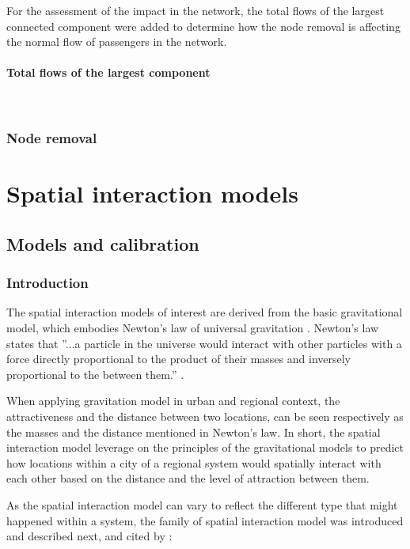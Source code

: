 \documentclass{article}
\begin{document}
For the assessment of the impact in the network, the total flows of the largest connected component were added to determine how the node removal is affecting the normal flow of passengers in the network.

\paragraph{Total flows of the largest component}\mbox{}\\



\subsubsection{Node removal}

\section{Spatial interaction models}


\subsection{Models and calibration}

\subsubsection{Introduction}

The spatial interaction models of interest are derived from the basic gravitational model, which embodies Newton's law of universal gravitation \citep{battyUrbanModellingAlgorithms1976}. Newton's law states that ''...a particle in the universe would interact with other particles with a force directly proportional to the product of their masses and inversely proportional to the between them.'' \citep{battyUrbanSimulationSpatial2023}.

When applying gravitation model in urban and regional context, the attractiveness and the distance between two locations, can be seen respectively as the masses and the distance mentioned in Newton's law. In short, the spatial interaction model leverage on the principles of the gravitational models to predict how locations within a city of a regional system would spatially interact with each other based on the distance and the level of attraction between them.

As the spatial interaction model can vary to reflect the different type that might happened within a system, the family of spatial interaction model was introduced and described next, \citep{wilsonEntropyUrbanRegional2011} and \citep{wilsonFamilySpatialInteraction1971} cited by \citep{battyUrbanModellingAlgorithms1976}:
\end{document}
